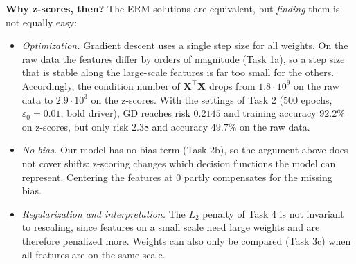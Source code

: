 \documentclass[a4paper,oneside,bibliography=totoc]{scrartcl}
\begin{document}
\begin{answer}[19.5cm]
  \textbf{Why z-scores, then?} The ERM solutions are equivalent, but \emph{finding} them is not equally easy:
  \begin{itemize}
    \item \emph{Optimization.} Gradient descent uses a single step size for all weights. On the raw data the
          features differ by orders of magnitude (Task 1a), so a step size that is stable along the
          large-scale features is far too small for the others. Accordingly, the condition number of
          $\mathbf X^\top\mathbf X$ drops from $1.8\cdot10^{9}$ on the raw data to $2.9\cdot10^{3}$ on the
          z-scores. With the settings of Task 2 (500 epochs, $\varepsilon_0=0.01$, bold driver), GD reaches
          risk $0.2145$ and training accuracy $92.2\%$ on z-scores, but only risk $2.38$ and accuracy
          $49.7\%$ on the raw data.
    \item \emph{No bias.} Our model has no bias term (Task 2b), so the argument above does not cover shifts:
          z-scoring changes which decision functions the model can represent. Centering the features at $0$
          partly compensates for the missing bias.
    \item \emph{Regularization and interpretation.} The $L_2$ penalty of Task 4 is not invariant to
          rescaling, since features on a small scale need large weights and are therefore penalized more.
          Weights can also only be compared (Task 3c) when all features are on the same scale.
  \end{itemize}
\end{answer}
\end{document}
